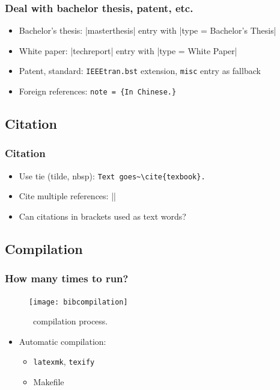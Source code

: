 \documentclass[CJKchecksingle]{beamer}
\newcommand{\BibTeX}{\hologo{BibTeX}}
\begin{document}
\begin{frame}[fragile]\frametitle{Deal with bachelor thesis, patent, etc.}

\begin{itemize}
  \item Bachelor's thesis: |masterthesis| entry with |type = {Bachelor's Thesis}|
  \item White paper: |techreport| entry with |type = {White Paper}|
  \item Patent, standard: \lstinline[style=cli]|IEEEtran.bst|
    extension, \lstinline{misc} entry as fallback
  \item Foreign references: \lstinline|note = {In Chinese.}|
\end{itemize}

\end{frame}


\subsection{Citation}
\begin{frame}[fragile]\frametitle{Citation}

\begin{itemize}
\item
  Use tie (tilde, nbsp): \lstinline|Text goes~\cite{texbook}.|
\item
  Cite multiple references: |\cite{ref1,ref2,ref3}|
\pause
\item
  Can citations in brackets used as text words?
\end{itemize}

\end{frame}

\subsection{Compilation}

\begin{frame}[fragile]\frametitle{How many times to run?}

  \begin{figure}[htbp]
    \centering
    \texttt{[image: bibcompilation]}
    \caption{\BibTeX\ compilation process.}
  \end{figure}

\begin{itemize}
    \pause
\item Automatic compilation:
  \begin{itemize}
    \item \lstinline[style=cli]{latexmk}, \lstinline[style=cli]|texify|
    \item Makefile
  \end{itemize}
\end{itemize}

\end{frame}
\end{document}

